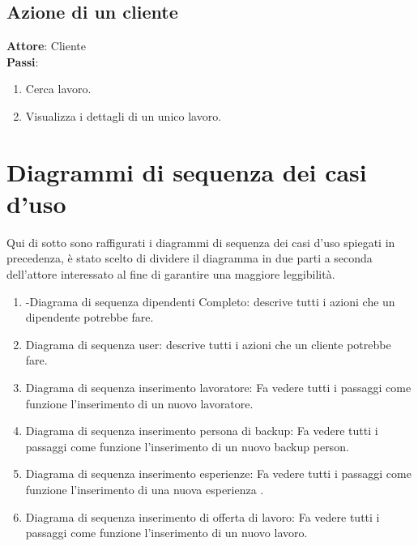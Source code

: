 \documentclass[ 4paper,11pt,openany]{book}
\begin{document}
	
\subsection{Azione di un cliente}
\textbf{Attore}: Cliente\\
\textbf{Passi}:
\begin{enumerate}
	\item Cerca lavoro.
	\item Visualizza i dettagli di un unico lavoro.
\end{enumerate}
\section{Diagrammi di sequenza dei casi d'uso}
Qui di sotto sono raffigurati i diagrammi di sequenza dei casi d'uso spiegati in precedenza, è stato scelto di dividere il diagramma in due parti a seconda dell'attore interessato al fine di garantire una maggiore leggibilità.
\begin{enumerate}
\item-Diagrama di sequenza dipendenti Completo: descrive tutti i azioni che un dipendente potrebbe fare.
\item Diagrama di sequenza user: descrive tutti i azioni che un cliente potrebbe fare.
\item Diagrama di sequenza inserimento lavoratore: Fa vedere tutti i passaggi come funzione l'inserimento di un nuovo lavoratore.
\item Diagrama di sequenza inserimento persona di backup: Fa vedere tutti i passaggi come funzione l'inserimento di un nuovo backup person.
\item Diagrama di sequenza inserimento esperienze: Fa vedere tutti i passaggi come funzione l'inserimento di una nuova esperienza .
\item Diagrama di sequenza inserimento di offerta di lavoro: Fa vedere tutti i passaggi come funzione l'inserimento di un nuovo lavoro.
\end{enumerate}
	
\end{document}
